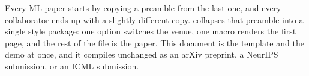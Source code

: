 Every ML paper starts by copying a preamble from the last one, and every
collaborator ends up with a slightly different copy. \method{} collapses that
preamble into a single style package: one option switches the venue, one macro
renders the first page, and the rest of the file is the paper. This document is
the template and the demo at once, and it compiles unchanged as an arXiv
preprint, a NeurIPS submission, or an ICML submission.
